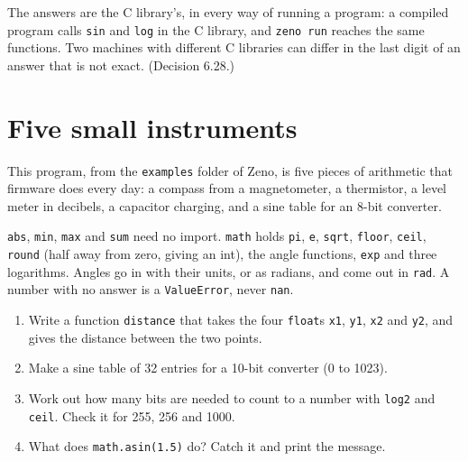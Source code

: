 The answers are the C library's, in every way of running a program:
a compiled program calls \verb|sin| and \verb|log| in the C library,
and \verb|zeno run| reaches the same functions. Two machines with
different C libraries can differ in the last digit of an answer that
is not exact. (Decision 6.28.)

\section{Five small instruments}

This program, from the \verb|examples| folder of Zeno, is five pieces
of arithmetic that firmware does every day: a compass from a
magnetometer, a thermistor, a level meter in decibels, a capacitor
charging, and a sine table for an 8-bit converter.

\begin{zeno}[src=examples/instruments.zeno]
\end{zeno}

\begin{summary}
\verb|abs|, \verb|min|, \verb|max| and \verb|sum| need no import.
\verb|math| holds \verb|pi|, \verb|e|, \verb|sqrt|, \verb|floor|,
\verb|ceil|, \verb|round| (half away from zero, giving an int), the
angle functions, \verb|exp| and three logarithms. Angles go in with
their units, or as radians, and come out in \verb|rad|. A number with
no answer is a \verb|ValueError|, never \verb|nan|.
\end{summary}

\begin{tryit}
\begin{enumerate}
\item Write a function \verb|distance| that takes the four
  \verb|float|s \verb|x1|, \verb|y1|, \verb|x2| and \verb|y2|, and
  gives the distance between the two points.
\item Make a sine table of 32 entries for a 10-bit converter (0 to
  1023).
\item Work out how many bits are needed to count to a number with
  \verb|log2| and \verb|ceil|. Check it for 255, 256 and 1000.
\item What does \verb|math.asin(1.5)| do? Catch it and print the
  message.
\end{enumerate}
\end{tryit}
